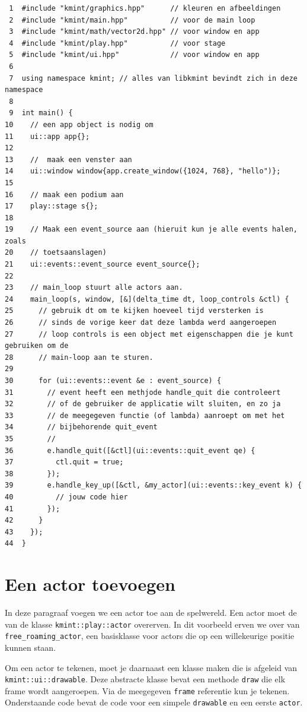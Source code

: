 \documentclass[11pt]{article}
\begin{document}
\begin{verbatim}
 1  #include "kmint/graphics.hpp"      // kleuren en afbeeldingen
 2  #include "kmint/main.hpp"          // voor de main loop
 3  #include "kmint/math/vector2d.hpp" // voor window en app
 4  #include "kmint/play.hpp"          // voor stage
 5  #include "kmint/ui.hpp"            // voor window en app
 6  
 7  using namespace kmint; // alles van libkmint bevindt zich in deze namespace
 8  
 9  int main() {
10    // een app object is nodig om
11    ui::app app{};
12  
13    //  maak een venster aan
14    ui::window window{app.create_window({1024, 768}, "hello")};
15  
16    // maak een podium aan
17    play::stage s{};
18  
19    // Maak een event_source aan (hieruit kun je alle events halen, zoals
20    // toetsaanslagen)
21    ui::events::event_source event_source{};
22  
23    // main_loop stuurt alle actors aan.
24    main_loop(s, window, [&](delta_time dt, loop_controls &ctl) {
25      // gebruik dt om te kijken hoeveel tijd versterken is
26      // sinds de vorige keer dat deze lambda werd aangeroepen
27      // loop controls is een object met eigenschappen die je kunt gebruiken om de
28      // main-loop aan te sturen.
29  
30      for (ui::events::event &e : event_source) {
31        // event heeft een methjode handle_quit die controleert
32        // of de gebruiker de applicatie wilt sluiten, en zo ja
33        // de meegegeven functie (of lambda) aanroept om met het
34        // bijbehorende quit_event
35        //
36        e.handle_quit([&ctl](ui::events::quit_event qe) {
37          ctl.quit = true;
38        });
39        e.handle_key_up([&ctl, &my_actor](ui::events::key_event k) {
40          // jouw code hier
41        });
42      }
43    });
44  }
\end{verbatim}

\section{Een actor toevoegen}
\label{sec:orge966c3a}
In deze paragraaf voegen we een actor toe aan de spelwereld. Een actor moet
de van de klasse \texttt{kmint::play::actor} overerven. In dit voorbeeld erven we
over van \texttt{free\_roaming\_actor}, een basisklasse voor actors die op een
willekeurige positie kunnen staan.

Om een actor te tekenen, moet je daarnaast een klasse maken die is afgeleid
van \texttt{kmint::ui::drawable}. Deze abstracte klasse bevat een methode \texttt{draw}
die elk frame wordt aangeroepen. Via de meegegeven \texttt{frame} referentie kun je
tekenen. Onderstaande code bevat de code voor een simpele \texttt{drawable} en een
eerste \texttt{actor}.
\end{document}
